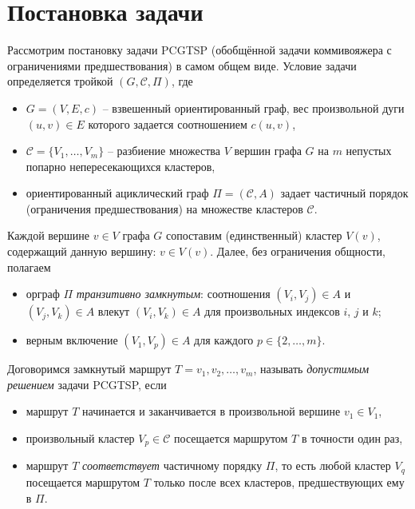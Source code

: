 
\section{Постановка задачи}
\label{sec:pcgtsp-stmt}

Рассмотрим постановку задачи PCGTSP
(обобщённой задачи коммивояжера с ограничениями предшествования)
в самом общем виде.
Условие задачи определяется тройкой
$(G,\mathcal C,\Pi)$,
где
\begin{itemize}
  \item
	$G=(V,E,c)$
  -- взвешенный ориентированный граф,
  вес произвольной дуги $(u,v)\in E$
  которого задается соотношением
  $c(u,v)$,
  \item
	$\mathcal C=\{V_1,\ldots,V_m\}$
  -- разбиение множества $V$
  вершин графа $G$ на $m$
  непустых попарно непересекающихся кластеров,
  \item
	ориентированный ациклический граф
  $ \Pi = (\mathcal C, A) $
  задает частичный порядок
  (ограничения предшествования)
  на множестве кластеров
  $\mathcal C$.
\end{itemize}

Каждой вершине
$v\in V$
графа $G$
сопоставим
(единственный)
кластер
$V(v)$,
содержащий данную вершину:
$v\in V(v)$.
Далее, без ограничения общности, полагаем
\begin{itemize}
  \item
  орграф $\Pi$
  \textit{транзитивно замкнутым}:
  соотношения $(V_i,V_j)\in A$ и $(V_j,V_k)\in A$
  влекут $(V_i,V_k)\in A$
  для произвольных индексов $i$, $j$ и $k$;
  \item
  верным включение
  $(V_1,V_p)\in A$
  для каждого
  $p\in\{2,\ldots,m\}$.
\end{itemize}

Договоримся замкнутый маршрут
$T=v_1, v_2, \ldots, v_m$,
называть \textit{допустимым решением} задачи PCGTSP,
если
\begin{itemize}
  \item
  маршрут $T$ начинается и заканчивается в произвольной вершине
  $v_1\in V_1$,
  \item
  произвольный кластер
  $V_p\in\mathcal C$
  посещается маршрутом $T$ в точности один раз,
  \item
  маршрут $T$ \textit{соответствует} частичному порядку
  $\Pi$,
  то есть любой кластер $V_q$
  посещается маршрутом $T$
  только после всех кластеров,
  предшествующих ему в $\Pi$.
\end{itemize}

